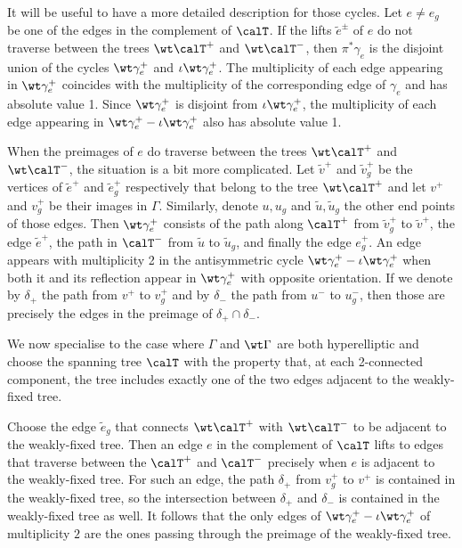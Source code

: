 It will be useful to have a more detailed description for those cycles. Let $e\neq e_g$ be one of the  edges in the complement of $\calT$. If the lifts $\tilde e^{\pm}$ of $e$ do not traverse between the trees $\wt\calT^+$ and $\wt\calT^-$, then $\pi^{*}\gamma_e$ is the disjoint union of the cycles 
$\wt\gamma^+_e$ and $\iota\wt\gamma^+_e$. The multiplicity of each edge appearing in $\wt\gamma^+_e$ coincides with the multiplicity of the corresponding edge of $\gamma_e$ and has absolute value 1. 
Since $\wt\gamma^+_e$ is disjoint from $\iota\wt\gamma^+_e$, the multiplicity of each edge appearing in
$\wt\gamma^+_e - \iota\wt\gamma^+_e$ also has absolute value 1. 

When the preimages of $e$ do traverse between  the trees $\wt\calT^+$ and $\wt\calT^-$, the situation is a bit more complicated. Let $\tilde v^+$ and $\tilde v_g^+$ be the vertices of $\tilde e^+$ and $\tilde e_g^+$ respectively that belong to the tree $\wt\calT^+$ and let $v^+$ and $v_g^+$ be their images in $\Gamma$. Similarly, denote $u, u_g$ and $\tilde u, \tilde u_g$  the other end points of those edges. Then $\wt\gamma^+_e$ consists of the path along $\calT^+$ from $\tilde v_g^+$ to $\tilde v^+$, the edge $\tilde e^+$, the path in $\calT^-$ from $\tilde u$ to $\tilde u_g$, and finally the edge $e_g^+$. An edge appears with multiplicity 2 in  the antisymmetric cycle $\wt\gamma^+_e-\iota\wt\gamma^+_e$ when both it and its reflection appear in $\wt\gamma^+_e$ with opposite orientation. 
If we denote by $\delta_+$  the path from $v^+$ to $v_g^+$  and by $\delta_{-}$  the path from $u^-$ to $u_g^-$, then those are precisely the edges  in the preimage of $\delta_+\cap\delta_{-}$. 

We now specialise to the case where $\Gamma$ and $\wt\Gamma$ are both hyperelliptic  and choose the spanning tree $\calT$  with the property that, at each 2-connected component, the tree  includes exactly one of the two edges adjacent to the weakly-fixed tree.


Choose the edge $\tilde e_g$ that connects $\wt\calT^+$ with $\wt\calT^-$  to be adjacent to the weakly-fixed tree. Then an edge $e$ in the complement of $\calT$  lifts to edges that traverse between the $\calT^+$ and $\calT^-$ precisely when $e$ is adjacent to the weakly-fixed tree. For such an edge, the path $\delta_+$ from $v_g^+$ to $v^+$ is contained in the weakly-fixed tree, so  the intersection between $\delta_+$ and $\delta_-$ is contained in the weakly-fixed tree as well. It follows that the only edges of $\wt\gamma^+_e-\iota\wt\gamma^+_e$ of multiplicity $2$ are the ones passing through the preimage of the weakly-fixed tree. 

